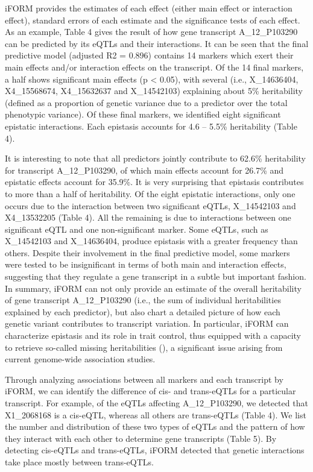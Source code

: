\documentclass[11pt,]{book}
\theoremstyle{definition}
\theoremstyle{definition}
\theoremstyle{remark}
\begin{document}
iFORM provides the estimates of each effect (either main effect or
interaction effect), standard errors of each estimate and the
significance tests of each effect. As an example, Table 4 gives the
result of how gene transcript A\_12\_P103290 can be predicted by its
eQTLs and their interactions. It can be seen that the final predictive
model (adjusted R2 = 0.896) contains 14 markers which exert their main
effects and/or interaction effects on the transcript. Of the 14 final
markers, a half shows significant main effects (p \textless{} 0.05),
with several (i.e., X\_14636404, X4\_15568674, X4\_15632637 and
X\_14542103) explaining about 5\% heritability (defined as a proportion
of genetic variance due to a predictor over the total phenotypic
variance). Of these final markers, we identified eight significant
epistatic interactions. Each epistasis accounts for 4.6 -- 5.5\%
heritability (Table 4).

It is interesting to note that all predictors jointly contribute to
62.6\% heritability for transcript A\_12\_P103290, of which main effects
account for 26.7\% and epistatic effects account for 35.9\%. It is very
surprising that epistasis contributes to more than a half of
heritability. Of the eight epistatic interactions, only one occurs due
to the interaction between two significant eQTLs, X\_14542103 and
X4\_13532205 (Table 4). All the remaining is due to interactions between
one significant eQTL and one non-significant marker. Some eQTLs, such as
X\_14542103 and X\_14636404, produce epistasis with a greater frequency
than others. Despite their involvement in the final predictive model,
some markers were tested to be insignificant in terms of both main and
interaction effects, suggesting that they regulate a gene transcript in
a subtle but important fashion. In summary, iFORM can not only provide
an estimate of the overall heritability of gene transcript
A\_12\_P103290 (i.e., the sum of individual heritabilities explained by
each predictor), but also chart a detailed picture of how each genetic
variant contributes to transcript variation. In particular, iFORM can
characterize epistasis and its role in trait control, thus equipped with
a capacity to retrieve so-called missing heritabilities
(\cite{manolio2009finding}), a significant issue arising from current
genome-wide association studies.

Through analyzing associations between all markers and each transcript
by iFORM, we can identify the difference of cis- and trans-eQTLs for a
particular transcript. For example, of the eQTLs affecting
A\_12\_P103290, we detected that X1\_2068168 is a cis-eQTL, whereas all
others are trans-eQTLs (Table 4). We list the number and distribution of
these two types of eQTLs and the pattern of how they interact with each
other to determine gene transcripts (Table 5). By detecting cis-eQTLs
and trans-eQTLs, iFORM detected that genetic interactions take place
mostly between trans-eQTLs.
\end{document}
